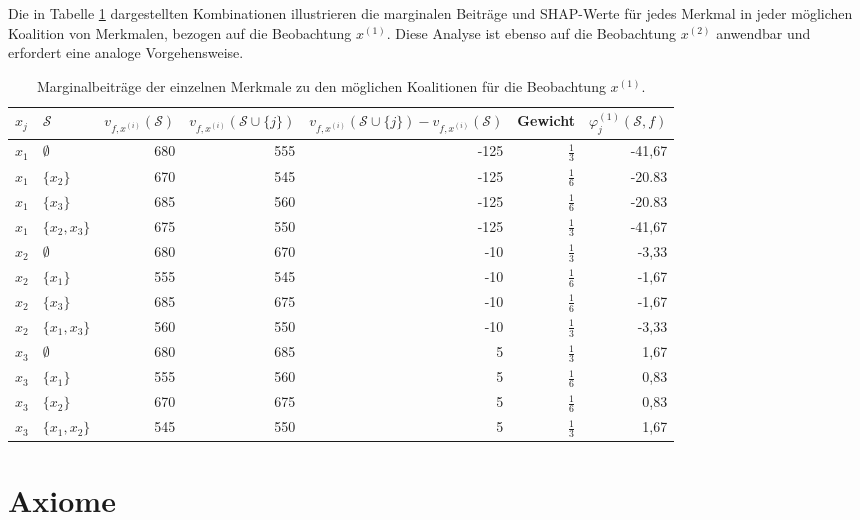 Die in Tabelle \ref{tab:shapley_marginal_features} dargestellten Kombinationen illustrieren die marginalen Beiträge und SHAP-Werte 
für jedes Merkmal in jeder möglichen Koalition von Merkmalen, bezogen auf die Beobachtung $x^{(1)}$. 
Diese Analyse ist ebenso auf die Beobachtung $x^{(2)}$ anwendbar und erfordert eine analoge Vorgehensweise.

\begin{table}[H]
    \footnotesize
    \begin{tabularx}{\textwidth}{XXrrrrr}
    \toprule
    $x_{j}$ & $\mathcal{S}$ & $v_{f, x^{(i)}}(\mathcal{S})$ & $v_{f, x^{(i)}}(\mathcal{S} \cup \{j\})$ & $v_{f, x^{(i)}}(\mathcal{S} \cup \{j\}) - v_{f, x^{(i)}}(\mathcal{S})$ & Gewicht & $\varphi_{j}^{(1)}(\mathcal{S}, f)$\\
    \midrule
    $x_1$ & $\emptyset$ & 680 & 555 & -125 & $\frac{1}{3}$ & -41,67 \\
    $x_1$ & $\{x_2\}$ & 670 & 545 & -125 & $\frac{1}{6}$ & -20.83 \\
    $x_1$ & $\{x_3\}$ & 685 & 560 & -125 & $\frac{1}{6}$ & -20.83 \\
    $x_1$ & $\{x_2, x_3\}$ & 675 & 550 & -125 & $\frac{1}{3}$ & -41,67 \\
    $x_2$ & $\emptyset$ & 680 & 670 & -10 & $\frac{1}{3}$ & -3,33 \\
    $x_2$ & $\{x_1\}$ & 555 & 545 & -10 & $\frac{1}{6}$ & -1,67 \\
    $x_2$ & $\{x_3\}$ & 685 & 675 & -10 & $\frac{1}{6}$ & -1,67 \\
    $x_2$ & $\{x_1, x_3\}$ & 560 & 550 & -10 & $\frac{1}{3}$ & -3,33 \\
    $x_3$ & $\emptyset$ & 680 & 685 & 5 & $\frac{1}{3}$ & 1,67 \\
    $x_3$ & $\{x_1\}$ & 555 & 560 & 5 & $\frac{1}{6}$ & 0,83 \\
    $x_3$ & $\{x_2\}$ & 670 & 675 & 5 & $\frac{1}{6}$ & 0,83 \\
    $x_3$ & $\{x_1, x_2\}$ & 545 & 550 & 5 & $\frac{1}{3}$ & 1,67 \\
    \bottomrule
    \end{tabularx}
    \caption{Marginalbeiträge der einzelnen Merkmale zu den möglichen Koalitionen für die Beobachtung $x^{(1)}$.}
    \label{tab:shapley_marginal_features}
\end{table}


\section{Axiome}


